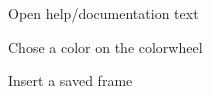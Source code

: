 \documentclass[11pt]{article} %
\begin{document}
{\begin{figure}[H]
	\centering
	\caption{Open help/documentation text}
	\label{fig:UC11}
\end{figure}

\begin{figure}[H]
	\centering
	\caption{Chose a color on the colorwheel}
	\label{fig:UC12}
\end{figure}

\begin{figure}[H]
	\centering
	\caption{Insert a saved frame}
	\label{fig:UC13}
\end{figure}

}
\end{document}
